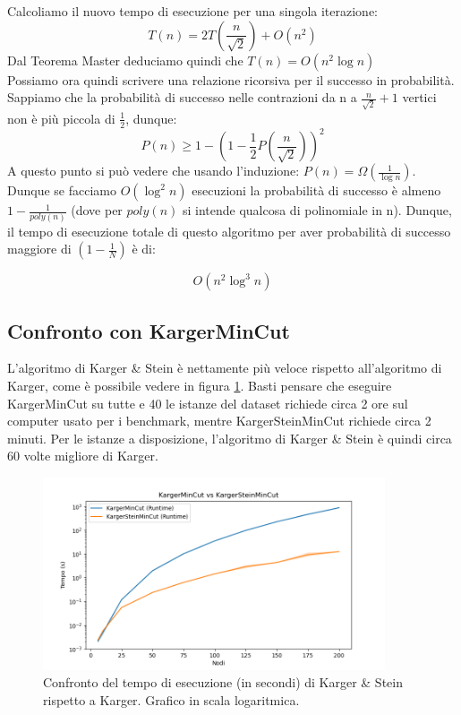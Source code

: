 Calcoliamo il nuovo tempo di esecuzione per una singola iterazione:
$$T(n) = 2T \left( \dfrac{n}{\sqrt{2}} \right) + O(n^2) $$
Dal Teorema Master deduciamo quindi che $T(n) = O(n^2 \log{n})$\\

\noindent Possiamo ora quindi scrivere una relazione ricorsiva per il successo in probabilità. Sappiamo che la probabilità di successo nelle contrazioni da n a $\frac{n}{\sqrt{2}} + 1$ vertici non è più piccola di $\frac{1}{2}$, dunque:
$$P(n) \geq 1- \left( 1- \frac{1}{2} P \left(\dfrac{n}{\sqrt{2}} \right) \right)^2$$
A questo punto si può vedere che usando l'induzione: $P(n)= \Omega(\frac{1}{\log{n}}) $. Dunque se facciamo $O(\log^2{n})$ esecuzioni la probabilità di successo è almeno $1-\frac{1}{poly(n)}$ (dove per $poly(n)$ si intende qualcosa di polinomiale in n). Dunque, il tempo di esecuzione totale di questo algoritmo per aver probabilità di successo maggiore di $(1 - \frac{1}{N})$ è di:

$$O(n^2 \log^3{n})$$

\subsection{Confronto con KargerMinCut}

\noindent L'algoritmo di Karger \& Stein è nettamente più veloce rispetto all'algoritmo di Karger, come è possibile vedere in figura \ref{fig:karger-vs-karger-stein}. Basti pensare che eseguire KargerMinCut su tutte e 40 le istanze del dataset richiede circa 2 ore sul computer usato per i benchmark, mentre KargerSteinMinCut richiede circa 2 minuti. Per le istanze a disposizione, l'algoritmo di Karger \& Stein è quindi circa 60 volte migliore di Karger.

\begin{figure}[H]
    \centering

    \includegraphics[width=0.9\textwidth]{./images/karger_vs_karger_stein - log.png}

    \caption{Confronto del tempo di esecuzione (in secondi) di Karger \& Stein rispetto a Karger. Grafico in scala logaritmica.}
    \label{fig:karger-vs-karger-stein}
\end{figure}


